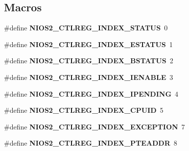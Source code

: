 \subsection*{Macros}
\begin{DoxyCompactItemize}
\item 
\mbox{\label{nios2-utility_8h_ae1641dfff7a53a7e0c609123b606d0c8}} 
\#define {\bfseries N\+I\+O\+S2\+\_\+\+C\+T\+L\+R\+E\+G\+\_\+\+I\+N\+D\+E\+X\+\_\+\+S\+T\+A\+T\+US}~0
\item 
\mbox{\label{nios2-utility_8h_ad41ecaf5b5fb27416ab7502d6552a369}} 
\#define {\bfseries N\+I\+O\+S2\+\_\+\+C\+T\+L\+R\+E\+G\+\_\+\+I\+N\+D\+E\+X\+\_\+\+E\+S\+T\+A\+T\+US}~1
\item 
\mbox{\label{nios2-utility_8h_ad250a519fe0ee3e00cb1bfc96b3f7190}} 
\#define {\bfseries N\+I\+O\+S2\+\_\+\+C\+T\+L\+R\+E\+G\+\_\+\+I\+N\+D\+E\+X\+\_\+\+B\+S\+T\+A\+T\+US}~2
\item 
\mbox{\label{nios2-utility_8h_a801388e2f716a0c289cf9acd3131eeed}} 
\#define {\bfseries N\+I\+O\+S2\+\_\+\+C\+T\+L\+R\+E\+G\+\_\+\+I\+N\+D\+E\+X\+\_\+\+I\+E\+N\+A\+B\+LE}~3
\item 
\mbox{\label{nios2-utility_8h_a744a3234c6c93f69c5302931c11fb964}} 
\#define {\bfseries N\+I\+O\+S2\+\_\+\+C\+T\+L\+R\+E\+G\+\_\+\+I\+N\+D\+E\+X\+\_\+\+I\+P\+E\+N\+D\+I\+NG}~4
\item 
\mbox{\label{nios2-utility_8h_a6319a80f7d928674cb9be09367d36824}} 
\#define {\bfseries N\+I\+O\+S2\+\_\+\+C\+T\+L\+R\+E\+G\+\_\+\+I\+N\+D\+E\+X\+\_\+\+C\+P\+U\+ID}~5
\item 
\mbox{\label{nios2-utility_8h_abbdccb1c471c48ef7312c3a090392f8c}} 
\#define {\bfseries N\+I\+O\+S2\+\_\+\+C\+T\+L\+R\+E\+G\+\_\+\+I\+N\+D\+E\+X\+\_\+\+E\+X\+C\+E\+P\+T\+I\+ON}~7
\item 
\mbox{\label{nios2-utility_8h_a24e0483e37c5d438935f8672cd4eecae}} 
\#define {\bfseries N\+I\+O\+S2\+\_\+\+C\+T\+L\+R\+E\+G\+\_\+\+I\+N\+D\+E\+X\+\_\+\+P\+T\+E\+A\+D\+DR}~8
\item 
\mbox{\label{nios2-utility_8h_a0c8725e84fcbfb3a72324c7586523486}} 

\end{DoxyCompactItemize}

